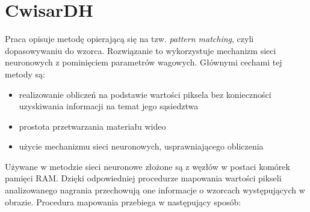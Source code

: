 \section{CwisarDH}
Praca \cite{6910014} opisuje metodę opierającą się na tzw. \textit{pattern matching}, czyli dopasowywaniu do wzorca. Rozwiązanie to wykorzystuje mechanizm sieci neuronowych z pominięciem parametrów wagowych. Głównymi cechami tej metody są:
\begin{itemize}
\item realizowanie obliczeń na podstawie wartości piksela bez konieczności uzyskiwania informacji na temat jego sąsiedztwa
\item prostota przetwarzania materiału wideo
\item użycie mechanizmu sieci neuronowych, usprawniającego obliczenia
\end{itemize}
Używane w metodzie sieci neuronowe złożone są z węzłów w postaci komórek pamięci RAM. Dzięki odpowiedniej procedurze mapowania wartości pikseli analizowanego nagrania przechowują one informacje o wzorcach występujących w obrazie. Procedura mapowania  przebiega w następujący sposób:
